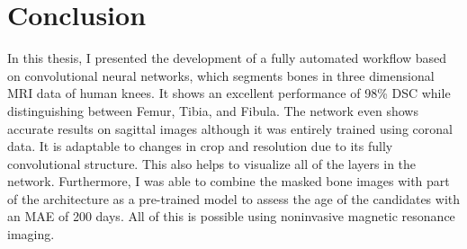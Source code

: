 \section{Conclusion}

In this thesis, I presented the development of a fully automated workflow based on convolutional neural networks, which segments bones in three dimensional MRI data of human knees. It shows an excellent performance of 98\% DSC while distinguishing between Femur, Tibia, and Fibula. The network even shows accurate results on sagittal images although it was entirely trained using coronal data. It is adaptable to changes in crop and resolution due to its fully convolutional structure. This also helps to visualize all of the layers in the network. Furthermore, I was able to combine the masked bone images with part of the architecture as a pre-trained model to assess the age of the candidates with an MAE of 200 days. All of this is possible using noninvasive magnetic resonance imaging.

\newpage